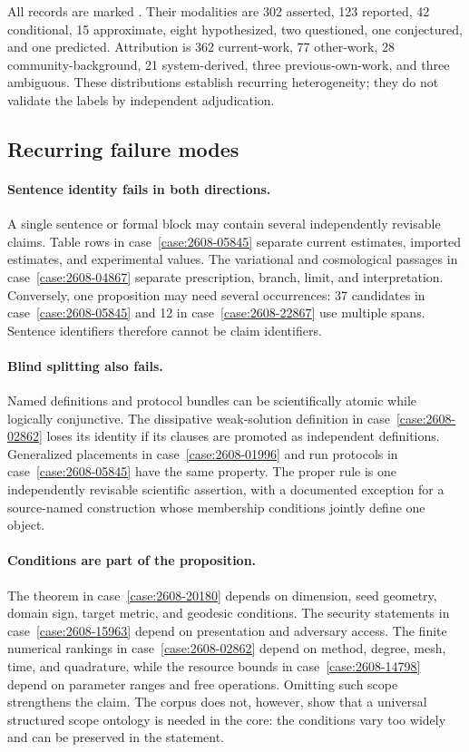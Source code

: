 All records are marked . Their modalities are 302 asserted, 123 reported, 42 conditional, 15 approximate, eight hypothesized, two questioned, one conjectured, and one predicted. Attribution is 362 current-work, 77 other-work, 28 community-background, 21 system-derived, three previous-own-work, and three ambiguous. These distributions establish recurring heterogeneity; they do not validate the labels by independent adjudication.

\subsection{Recurring failure modes}

\paragraph{Sentence identity fails in both directions.}
A single sentence or formal block may contain several independently revisable claims. Table rows in case~\ref{case:2608-05845} separate current estimates, imported estimates, and experimental values. The variational and cosmological passages in case~\ref{case:2608-04867} separate prescription, branch, limit, and interpretation. Conversely, one proposition may need several occurrences: 37 candidates in case~\ref{case:2608-05845} and 12 in case~\ref{case:2608-22867} use multiple spans. Sentence identifiers therefore cannot be claim identifiers.

\paragraph{Blind splitting also fails.}
Named definitions and protocol bundles can be scientifically atomic while logically conjunctive. The dissipative weak-solution definition in case~\ref{case:2608-02862} loses its identity if its clauses are promoted as independent definitions. Generalized placements in case~\ref{case:2608-01996} and run protocols in case~\ref{case:2608-05845} have the same property. The proper rule is one independently revisable scientific assertion, with a documented exception for a source-named construction whose membership conditions jointly define one object.

\paragraph{Conditions are part of the proposition.}
The theorem in case~\ref{case:2608-20180} depends on dimension, seed geometry, domain sign, target metric, and geodesic conditions. The security statements in case~\ref{case:2608-15963} depend on presentation and adversary access. The finite numerical rankings in case~\ref{case:2608-02862} depend on method, degree, mesh, time, and quadrature, while the resource bounds in case~\ref{case:2608-14798} depend on parameter ranges and free operations. Omitting such scope strengthens the claim. The corpus does not, however, show that a universal structured scope ontology is needed in the core: the conditions vary too widely and can be preserved in the statement.

